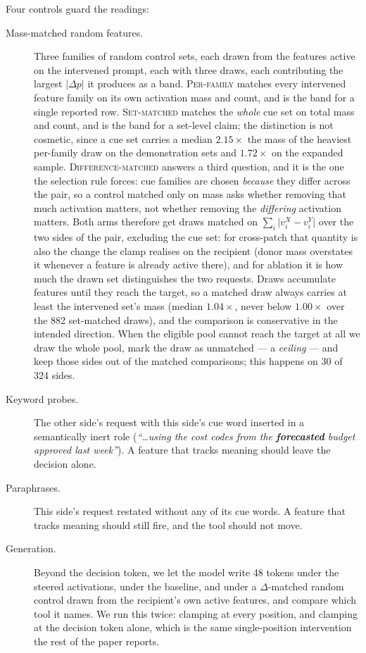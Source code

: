 \documentclass{article}
\begin{document}
Four controls guard the readings:

\begin{description}
\item[Mass-matched random features.] Three families of random control sets, each drawn from the features active on the intervened prompt, each with three draws, each contributing the largest $|\Delta p|$ it produces as a band. \textsc{Per-family} matches every intervened feature family on its own activation mass and count, and is the band for a single reported row. \textsc{Set-matched} matches the \emph{whole} cue set on total mass and count, and is the band for a set-level claim; the distinction is not cosmetic, since a cue set carries a median $2.15\times$ the mass of the heaviest per-family draw on the demonstration sets and $1.72\times$ on the expanded sample. \textsc{Difference-matched} answers a third question, and it is the one the selection rule forces: cue families are chosen \emph{because} they differ across the pair, so a control matched only on mass asks whether removing that much activation matters, not whether removing the \emph{differing} activation matters. Both arms therefore get draws matched on $\sum_i \lvert v^{X}_i - v^{Y}_i \rvert$ over the two sides of the pair, excluding the cue set: for cross-patch that quantity is also the change the clamp realises on the recipient (donor mass overstates it whenever a feature is already active there), and for ablation it is how much the drawn set distinguishes the two requests. Draws accumulate features until they reach the target, so a matched draw always carries at least the intervened set's mass (median $1.04\times$, never below $1.00\times$ over the 882 set-matched draws), and the comparison is conservative in the intended direction. When the eligible pool cannot reach the target at all we draw the whole pool, mark the draw as unmatched --- a \emph{ceiling} --- and keep those sides out of the matched comparisons; this happens on 30 of 324 sides.
\item[Keyword probes.] The other side's request with this side's cue word inserted in a semantically inert role (\emph{``\dots using the cost codes from the \textbf{forecasted} budget approved last week''}). A feature that tracks meaning should leave the decision alone.
\item[Paraphrases.] This side's request restated without any of its cue words. A feature that tracks meaning should still fire, and the tool should not move.
\item[Generation.] Beyond the decision token, we let the model write 48 tokens under the steered activations, under the baseline, and under a $\Delta$-matched random control drawn from the recipient's own active features, and compare which tool it names. We run this twice: clamping at every position, and clamping at the decision token alone, which is the same single-position intervention the rest of the paper reports.
\end{description}
\end{document}
